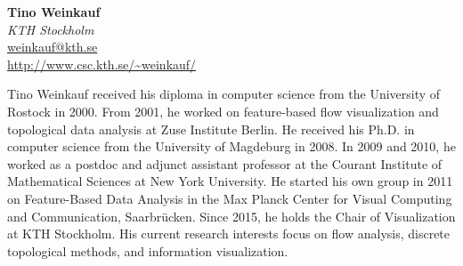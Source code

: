 \documentclass[preprint,journal]{vgtc}       %
\newcommand{\addverticalspace}{\vspace{3mm}}
\begin{document}
\printbibliography[title={Relevant Publications},category=Wang]

\noindent \textbf{Tino Weinkauf}\\
\emph{KTH Stockholm}\\
\href{mailto:weinkauf@kth.se}{weinkauf@kth.se}\\
\url{http://www.csc.kth.se/~weinkauf/}

\addverticalspace
Tino Weinkauf received his diploma in computer science from the University of Rostock in 2000. From 2001, he worked on feature-based flow visualization and topological data analysis at Zuse Institute Berlin. He received his Ph.D. in computer science from the University of Magdeburg in 2008. In 2009 and 2010, he worked as a postdoc and adjunct assistant professor at the Courant Institute of Mathematical Sciences at New York University. He started his own group in 2011 on Feature-Based Data Analysis in the Max Planck Center for Visual Computing and Communication, Saarbrücken. Since 2015, he holds the Chair of Visualization at KTH Stockholm. His current research interests focus on flow analysis, discrete topological methods, and information visualization.

\printbibliography[title={Relevant Publications},category=Weinkauf]

\printbibliography[title={Other References},category=Other]


% 
% 
\end{document}
